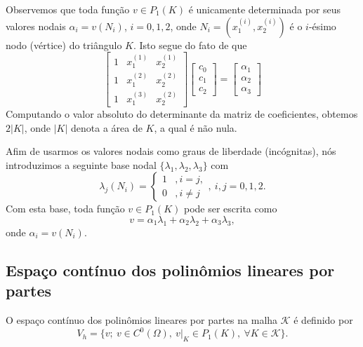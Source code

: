 Observemos que toda função $v\in P_1(K)$ é unicamente determinada por seus valores nodais $\alpha_i = v(N_i)$, $i=0, 1, 2$, onde $N_i = (x_1^{(i)}, x_2^{(i)})$ é o $i$-ésimo nodo (vértice) do triângulo $K$. Isto segue do fato de que
\begin{equation}
  \begin{bmatrix}
    1 & x_1^{(1)} & x_2^{(1)}\\
    1 & x_1^{(2)} & x_2^{(2)}\\
    1 & x_1^{(3)} & x_2^{(2)}
  \end{bmatrix}
  \begin{bmatrix}
    c_0\\
    c_1\\
    c_2
  \end{bmatrix} = 
  \begin{bmatrix}
    \alpha_1\\
    \alpha_2\\
    \alpha_3
  \end{bmatrix}
\end{equation}
Computando o valor absoluto do determinante da matriz de coeficientes, obtemos $2|K|$, onde $|K|$ denota a área de $K$, a qual é não nula.

Afim de usarmos os valores nodais como graus de liberdade (incógnitas), nós introduzimos a seguinte base nodal $\{\lambda_1, \lambda_2, \lambda_3\}$ com
\begin{equation}
  \lambda_j(N_i) = \left\{
    \begin{array}{ll}
      1 &, i=j,\\
      0 &, i\neq j
    \end{array}
\right.,~i,j=0,1,2.
\end{equation}
Com esta base, toda função $v\in P_1(K)$ pode ser escrita como
\begin{equation}
  v = \alpha_1\lambda_1 + \alpha_2\lambda_2 + \alpha_3\lambda_3,
\end{equation}
onde $\alpha_i = v(N_i)$.

\subsection{Espaço contínuo dos polinômios lineares por partes}

O espaço contínuo dos polinômios lineares por partes na malha $\mathcal{K}$ é definido por
\begin{equation}
  V_h = \{v;~v\in C^0(\Omega),~v|_K\in P_1(K),~\forall K\in\mathcal{K}\}.
\end{equation}

